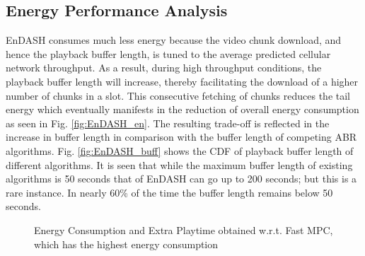 \subsection{Energy Performance Analysis}
EnDASH consumes much less energy because the video chunk download, and hence the playback buffer length, is tuned to the average predicted cellular network throughput. As a result, during high throughput conditions, the playback buffer length will increase, thereby facilitating the download of a higher number of chunks in a slot. This consecutive fetching of chunks reduces the tail energy which eventually manifests in the reduction of overall energy consumption as seen in Fig. \ref{fig:EnDASH_en}. The resulting trade-off is reflected in the increase in buffer length in comparison with the buffer length of competing ABR algorithms.  Fig. \ref{fig:EnDASH_buff} shows the CDF of playback buffer length of different algorithms. It is seen that while the maximum buffer length of existing algorithms is 50 seconds that of EnDASH can go up to 200 seconds; but this is a rare instance. In nearly 60\% of the time the buffer length remains below 50 seconds.
\begin{figure}[ht]%
	\centering
	{}	
	\caption{Energy Consumption and Extra Playtime obtained w.r.t. Fast MPC, which has the highest energy consumption}
	\label{fig:vid_time_save}
\end{figure}
